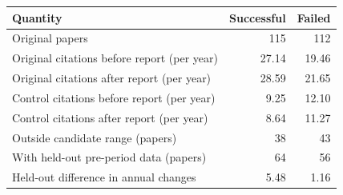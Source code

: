 \begin{tabular}{lrr}
\toprule
Quantity & Successful & Failed \\
\midrule
Original papers & 115 & 112 \\
Original citations before report (per year) & 27.14 & 19.46 \\
Original citations after report (per year) & 28.59 & 21.65 \\
Control citations before report (per year) & 9.25 & 12.10 \\
Control citations after report (per year) & 8.64 & 11.27 \\
Outside candidate range (papers) & 38 & 43 \\
With held-out pre-period data (papers) & 64 & 56 \\
Held-out difference in annual changes & 5.48 & 1.16 \\
\bottomrule
\end{tabular}
